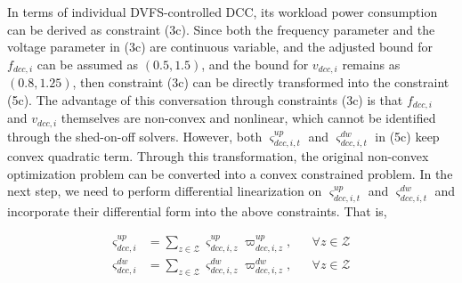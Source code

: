 \documentclass[lettersize,journal]{IEEEtran}
\begin{document}
In terms of individual DVFS-controlled DCC, its workload power consumption can be derived as constraint (3c). Since both the frequency parameter and the voltage parameter in (3c) are continuous variable, and the adjusted bound for \(f_{dcc, i}\) can be assumed as $(0.5, 1.5)$, and the bound for	\(v_{dcc, i}\) remains as $(0.8, 1.25)$, then constraint (3c) can be directly transformed into the constraint (5c). The advantage of this conversation through constraints (3c) is that \(f_{dcc, i}\) and \(v_{dcc, i}\) themselves are non-convex and nonlinear, which cannot be identified through the shed-on-off solvers. However, both \(\varsigma_{dcc,i,t}^{up}\) and \(\varsigma_{dcc,i,t}^{dw}\) in (5c) keep convex quadratic term. Through this transformation,	the original non-convex optimization problem can be converted into a convex constrained problem.	In the next step, we need to perform differential linearization on \(\varsigma_{dcc, i,t}^{up}\) and \(\varsigma_{dcc, i,t}^{dw}\) and incorporate their differential form into the above constraints. That is,


\vspace{-0.25cm}
\begin{subequations}
	\begin{align}
		\varsigma_{dcc,i}^{up} & = \sum\nolimits_{z\in\mathcal{Z}} \varsigma_{dcc,i,z}^{up} \varpi_{dcc,i,z}^{up}, &  & \forall z\in\mathcal{Z} \label{eq:6a} \\
		\varsigma_{dcc,i}^{dw} & = \sum\nolimits_{z\in\mathcal{Z}} \varsigma_{dcc,i,z}^{dw} \varpi_{dcc,i,z}^{dw}, &  & \forall z\in\mathcal{Z} \label{eq:6b}
	\end{align}
\end{subequations}

\noindent
\end{document}
